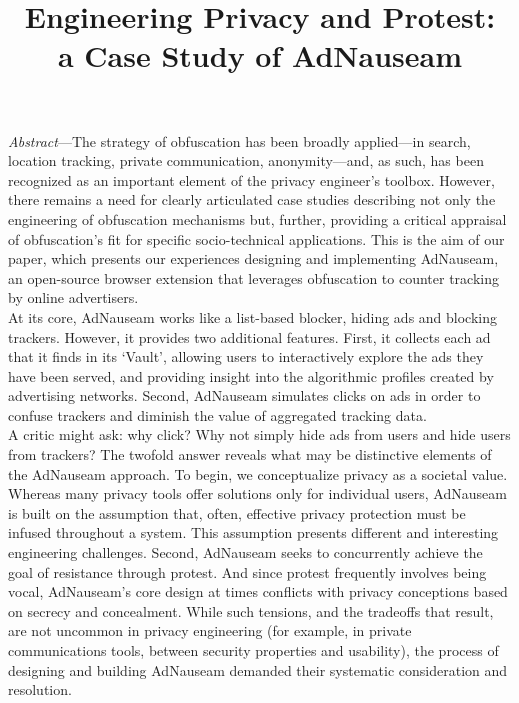 \documentclass[conference]{IEEEtran}
\begin{document}
\title{Engineering Privacy and Protest:\\a Case Study of AdNauseam}

\author{
   \and
}

\maketitle

\emph{Abstract}---The strategy of obfuscation has been broadly applied---in search, location tracking, private communication, anonymity---and, as such, has been recognized as an important element of the privacy engineer's toolbox. However, there remains a need for clearly articulated case studies describing not only the engineering of obfuscation mechanisms but, further, providing a critical appraisal of obfuscation's fit for specific socio-technical applications. This is the aim of our paper, which presents our experiences designing and implementing AdNauseam, an open-source browser extension that leverages obfuscation to counter tracking by online advertisers.\\
\indent At its core, AdNauseam works like a list-based blocker, hiding ads and blocking trackers. However, it provides two additional features. First, it collects each ad that it finds in its ‘Vault’, allowing users to interactively explore the ads they have been served, and providing insight into the algorithmic profiles created by advertising networks. Second, AdNauseam simulates clicks on ads in order to confuse trackers and diminish the value of aggregated tracking data.\\
\indent A critic might ask: why click? Why not simply hide ads from users and hide users from trackers? The twofold answer reveals what may be distinctive elements of the AdNauseam approach. To begin, we conceptualize privacy as a societal value. Whereas many privacy tools offer solutions only for individual users, AdNauseam is built on the assumption that, often, effective privacy protection must be infused throughout a system. This assumption presents different and interesting engineering challenges. Second, AdNauseam seeks to concurrently achieve the goal of resistance through protest. And since protest frequently involves being vocal, AdNauseam's core design at times conflicts with privacy conceptions based on secrecy and concealment. While such tensions, and the tradeoffs that result, are not uncommon in privacy engineering (for example, in private communications tools, between security properties and usability), the process of designing and building AdNauseam demanded their systematic consideration and resolution.\\
\end{document}

